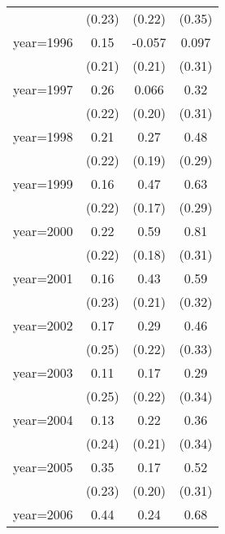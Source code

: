 \begin{sidewaystable}[htbp]
\begin{tabular}{l*{3}{c}}
                &   (0.23)         &   (0.22)         &   (0.35)         \\
\addlinespace
year=1996       &     0.15         &   -0.057         &    0.097         \\
                &   (0.21)         &   (0.21)         &   (0.31)         \\
\addlinespace
year=1997       &     0.26         &    0.066         &     0.32         \\
                &   (0.22)         &   (0.20)         &   (0.31)         \\
\addlinespace
year=1998       &     0.21         &     0.27         &     0.48\sym{*}  \\
                &   (0.22)         &   (0.19)         &   (0.29)         \\
\addlinespace
year=1999       &     0.16         &     0.47\sym{***}&     0.63\sym{**} \\
                &   (0.22)         &   (0.17)         &   (0.29)         \\
\addlinespace
year=2000       &     0.22         &     0.59\sym{***}&     0.81\sym{**} \\
                &   (0.22)         &   (0.18)         &   (0.31)         \\
\addlinespace
year=2001       &     0.16         &     0.43\sym{**} &     0.59\sym{*}  \\
                &   (0.23)         &   (0.21)         &   (0.32)         \\
\addlinespace
year=2002       &     0.17         &     0.29         &     0.46         \\
                &   (0.25)         &   (0.22)         &   (0.33)         \\
\addlinespace
year=2003       &     0.11         &     0.17         &     0.29         \\
                &   (0.25)         &   (0.22)         &   (0.34)         \\
\addlinespace
year=2004       &     0.13         &     0.22         &     0.36         \\
                &   (0.24)         &   (0.21)         &   (0.34)         \\
\addlinespace
year=2005       &     0.35         &     0.17         &     0.52         \\
                &   (0.23)         &   (0.20)         &   (0.31)         \\
\addlinespace
year=2006       &     0.44\sym{*}  &     0.24         &     0.68\sym{**} \\

\end{tabular}
\end{sidewaystable}
